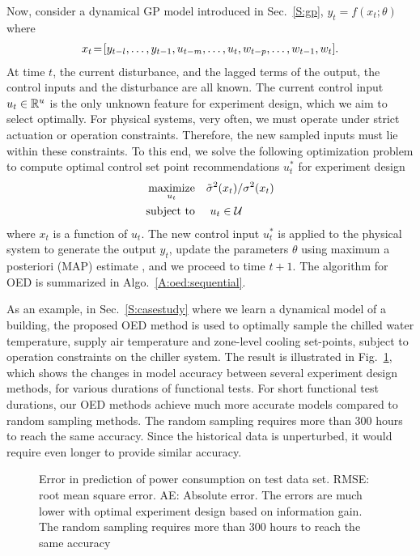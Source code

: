 Now, consider a dynamical GP model introduced in Sec.~\ref{S:gp},
\begin{math}
y_{t} = f(x_t;\theta)
\end{math}
where
\begin{align}
x_{t}\!=\![y_{t-l}, \dots, y_{t-1}, u_{t-m}, \dots, u_t, w_{t-p}, \dots, w_{t-1}, w_t] \text.
\label{E:GP:features}
\end{align}
At time \(t\), the current disturbance, and the lagged terms of the output, the control inputs and the disturbance are all known. The current control input \(u_t \in \mathbb{R}^u \) is the only unknown feature for experiment design, which we aim to select optimally.
For physical systems, very often, we must operate under strict actuation or operation constraints. Therefore, the new sampled inputs must lie within these constraints. To this end, we solve the following optimization problem to compute optimal control set point recommendations \(u^*_t\) for experiment design
\begin{align}
\label{E:oed:sampling}
\maximize_{u_{t}} & \ \ \ \tilde{\sigma}^2(x_t)/{\sigma}^2(x_t) \\
\st &  \ \ \ \   u_t \in \mathcal{U} \nonumber
\end{align}
where \(x_t\) is a function of \(u_t\). The new control input \(u^*_t\) is applied to the physical system to generate the output \(y_t\), update the parameters \(\theta\) using maximum a posteriori (MAP) estimate \cite{Garnett2013}, and we proceed to time \(t+1\). 
The algorithm for OED is summarized in Algo.~\ref{A:oed:sequential}.

As an example, in Sec.~\ref{S:casestudy} where we learn a dynamical model of a building, the proposed OED method is used to optimally sample the chilled water temperature, supply air temperature and zone-level cooling set-points, subject to operation constraints on the chiller system.
The result is illustrated in Fig.~\ref{F:oed:example}, which shows the changes in model accuracy between several experiment design methods, for various durations of functional tests.
For short functional test durations, our OED methods achieve much more accurate models compared to random sampling methods. The random sampling requires more than 300 hours to reach the same accuracy. Since the historical data is unperturbed, it would require even longer to provide similar accuracy.

\begin{figure}[!tb]
  \centering
  \setlength{}
  \setlength{}	
  
  \caption{Error in prediction of power consumption on test data set. RMSE: root mean square error. AE: Absolute error. The errors are much lower with optimal experiment design based on information gain. The random sampling requires more than 300 hours to reach the same accuracy}
  \captionsetup{justification=centering}
  \label{F:oed:example}
\end{figure}


